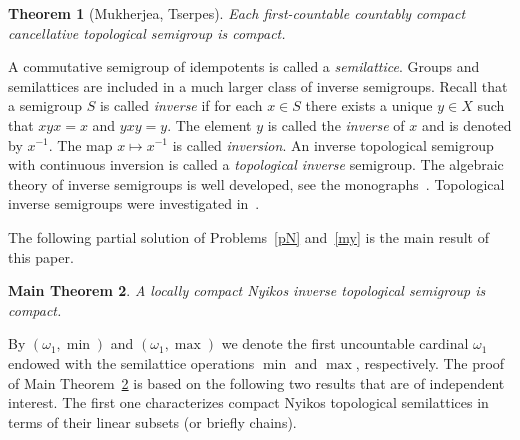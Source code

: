 \documentclass[12pt, twoside, leqno]{article}
\newtheorem{theorem}{Theorem}[section]
\newtheorem{corollary}[theorem]{Corollary}
\newtheorem{mainthm}[theorem]{Main Theorem}
\theoremstyle{definition}
\numberwithin{equation}{section}
\newcommand{\w}{\omega}
\begin{document}
\begin{theorem}[Mukherjea, Tserpes]\label{MU}
Each first-countable countably compact cancellative topological semigroup is compact.   \end{theorem}



A commutative semigroup of idempotents is called a {\em semilattice}. Groups and semilattices are included in a much larger class of inverse semigroups. Recall that a semigroup $S$ is called {\em inverse} if for each $x\in S$ there exists a unique $y\in X$ such that $xyx=x$ and $yxy=y$. The element $y$ is called the {\em inverse} of $x$ and is denoted by $x^{-1}$. The map $x\mapsto x^{-1}$ is called {\em inversion}. An inverse topological semigroup with continuous inversion is called a {\em topological inverse} semigroup.
The algebraic theory of inverse semigroups is well developed, see the monographs~\cite{Howie,Lawson,Petrich1984}. Topological inverse  semigroups were investigated in~\cite{BB, BBK, BDG, BP, B, our,main,main1, GRep, GR, HS, MPU}.


The following partial solution of Problems~\ref{pN} and~\ref{my} is the main result of this paper.

\begin{mainthm}\label{main}
A locally compact Nyikos inverse topological semigroup is compact.
\end{mainthm}


By $(\w_1,\min)$ and $(\omega_1,\max)$ we denote the first uncountable cardinal $\w_1$ endowed with the semilattice operations $\min$ and $\max$, respectively.
The proof of Main Theorem~\ref{main} is based on the following two results that are of independent interest. The first one characterizes compact Nyikos topological semilattices in terms of their linear subsets (or briefly chains).  
\end{document}
